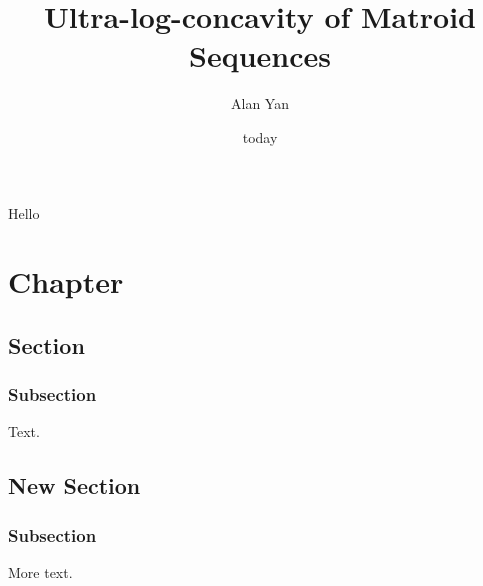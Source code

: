 \documentclass{puthesis-UG}
\author{Alan Yan}
\title{Ultra-log-concavity of Matroid Sequences}
\date{today}
\begin{document}
Hello 
\chapter{Chapter}

\section{Section}

\subsection{Subsection}

Text.

\section{New Section}

\subsection{Subsection}
More text.
\end{document}
